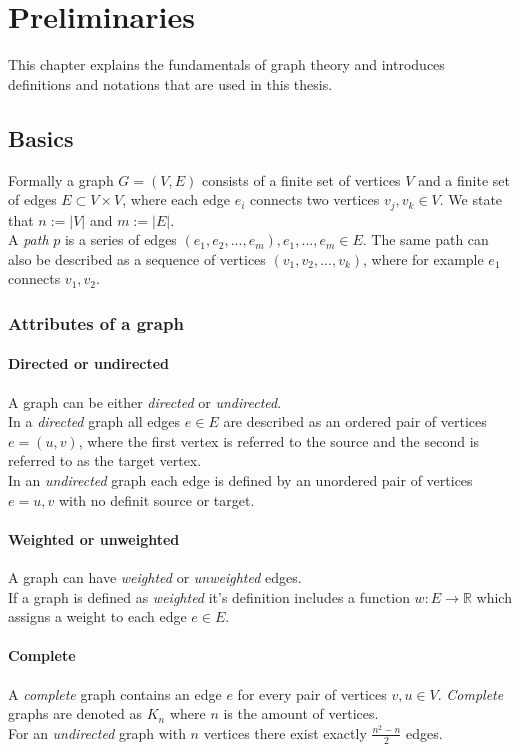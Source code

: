 
\chapter{Preliminaries}
  \label{PR}
This chapter explains the fundamentals of graph theory and introduces definitions and notations that are used in this thesis.
\section{Basics}
Formally a graph $G = (V, E)$ consists of a finite set of vertices $V$ and a finite set of edges $E \subset V \times V$, where each edge $e_i$ connects two vertices $v_j, v_k \in V$. We state that $n := |V|$ and $m := |E|$.\\
A \textit{path} $p$ is a series of edges $(e_1, e_2,...,e_m), e_1,...,e_m \in E$. The same path can also be described as a sequence of vertices $(v_1,v_2,...,v_k)$, where for example $e_1$ connects $v_1,v_2$.
\subsection{Attributes of a graph}
\subsubsection{Directed or undirected}
A graph can be either \textit{directed} or \textit{undirected}.\\
In a \textit{directed} graph all edges $e \in E$ are described as an ordered pair of vertices $e = (u,v)$, where the first vertex is referred to the source and the second is referred to as the target vertex.\\
In an \textit{undirected} graph each edge is defined by an unordered pair of vertices $e = {u,v}$ with no definit source or target. 
\subsubsection{Weighted or unweighted}
A graph can have \textit{weighted} or \textit{unweighted} edges.\\
If a graph is defined as \textit{weighted} it's definition includes a function $w: E \rightarrow \mathbb{R}$ which assigns a weight to each edge $e \in E$. 
\subsubsection{Complete} 
A \textit{complete} graph contains an edge $e$ for every pair of vertices $v, u \in V$. \textit{Complete} graphs are denoted as $K_n$ where $n$ is the amount of vertices.\\
For an \textit{undirected} graph with $n$ vertices there exist exactly $\frac{n^2 -n}{2}$ edges. 
